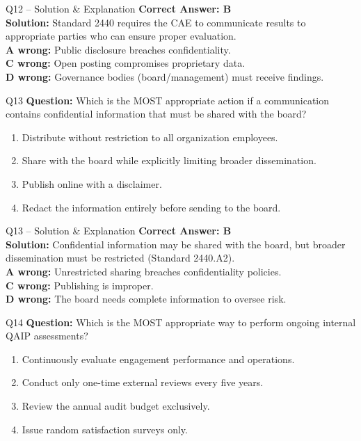 \documentclass[aspectratio=169,10pt]{beamer}
\begin{document}
	\begin{frame}[t]{Q12 -- Solution \& Explanation}
		\small
		\textbf{Correct Answer: B} \\[4pt]
		\textbf{Solution:} Standard 2440 requires the CAE to communicate results to appropriate parties who can ensure proper evaluation. \\[4pt]
		\textbf{A wrong:} Public disclosure breaches confidentiality. \\[2pt]
		\textbf{C wrong:} Open posting compromises proprietary data. \\[2pt]
		\textbf{D wrong:} Governance bodies (board/management) must receive findings.
	\end{frame}
	
	\begin{frame}[t]{Q13}
		\small
		\textbf{Question:} Which is the MOST appropriate action if a communication contains confidential information that must be shared with the board?
		\begin{enumerate}[label=\Alph*.,itemsep=1pt,topsep=2pt]
			\item Distribute without restriction to all organization employees.
			\item Share with the board while explicitly limiting broader dissemination.
			\item Publish online with a disclaimer.
			\item Redact the information entirely before sending to the board.
		\end{enumerate}
	\end{frame}
	
	\begin{frame}[t]{Q13 -- Solution \& Explanation}
		\small
		\textbf{Correct Answer: B} \\[4pt]
		\textbf{Solution:} Confidential information may be shared with the board, but broader dissemination must be restricted (Standard 2440.A2). \\[4pt]
		\textbf{A wrong:} Unrestricted sharing breaches confidentiality policies. \\[2pt]
		\textbf{C wrong:} Publishing is improper. \\[2pt]
		\textbf{D wrong:} The board needs complete information to oversee risk.
	\end{frame}
	
	\begin{frame}[t]{Q14}
		\small
		\textbf{Question:} Which is the MOST appropriate way to perform ongoing internal QAIP assessments?
		\begin{enumerate}[label=\Alph*.,itemsep=1pt,topsep=2pt]
			\item Continuously evaluate engagement performance and operations.
			\item Conduct only one-time external reviews every five years.
			\item Review the annual audit budget exclusively.
			\item Issue random satisfaction surveys only.
		\end{enumerate}
	\end{frame}
	
\end{document}

